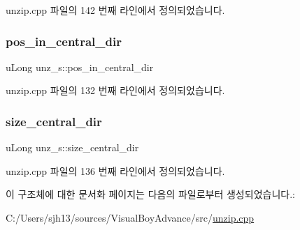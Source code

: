 unzip.\+cpp 파일의 142 번째 라인에서 정의되었습니다.

\mbox{\label{structunz__s_a70f2901a7ba85573aa280bad826baf4a}} 
\subsubsection{\texorpdfstring{pos\+\_\+in\+\_\+central\+\_\+dir}{pos\_in\_central\_dir}}
{\footnotesize\ttfamily u\+Long unz\+\_\+s\+::pos\+\_\+in\+\_\+central\+\_\+dir}



unzip.\+cpp 파일의 132 번째 라인에서 정의되었습니다.

\mbox{\label{structunz__s_a60b803a02e17ae46755cb94026ae973a}} 
\subsubsection{\texorpdfstring{size\+\_\+central\+\_\+dir}{size\_central\_dir}}
{\footnotesize\ttfamily u\+Long unz\+\_\+s\+::size\+\_\+central\+\_\+dir}



unzip.\+cpp 파일의 136 번째 라인에서 정의되었습니다.



이 구조체에 대한 문서화 페이지는 다음의 파일로부터 생성되었습니다.\+:\begin{DoxyCompactItemize}
\item 
C\+:/\+Users/sjh13/sources/\+Visual\+Boy\+Advance/src/\mbox{\hyperlink{unzip_8cpp}{unzip.\+cpp}}\end{DoxyCompactItemize}
